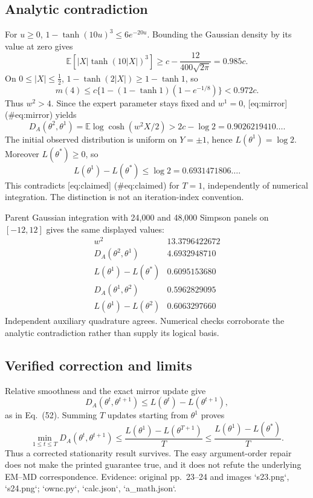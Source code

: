 \documentclass[10pt]{article}
\begin{document}
\subsection*{Analytic contradiction}
For \(u\ge0\), \(1-\tanh(10u)^3\le6e^{-20u}\). Bounding the Gaussian density by its value at zero gives \[\mathbb E[|X|\tanh(10|X|)^3]\ge
 c-\frac{12}{400\sqrt{2\pi}}=0.985c .\] On \(0\le |X|\le\tfrac12\), \(1-\tanh(2|X|)\ge1-\tanh1\), so \[m(4)\le c\{1-(1-\tanh1)(1-e^{-1/8})\}<0.972c .\] Thus \(w^2>4\). Since the expert parameter stays fixed and \(w^1=0\), [eq:mirror] (\#eq:mirror) yields \[D_A(\theta^2,\theta^1)
 =\mathbb E\log\cosh(w^2X/2)
 >2c-\log2=0.9026219410\ldots .\] The initial observed distribution is uniform on \(Y=\pm1\), hence \(L(\theta^1)=\log2\). Moreover \(L(\theta^*)\ge0\), so \[L(\theta^1)-L(\theta^*)\le\log2=0.6931471806\ldots .\] This contradicts [eq:claimed] (\#eq:claimed) for \(T=1\), independently of numerical integration. The distinction is not an iteration-index convention.\par
Parent Gaussian integration with 24,000 and 48,000 Simpson panels on \([-12,12]\) gives the same displayed values: \[\begin{array}{l|r}
 w^2&13.3796422672\\
 D_A(\theta^2,\theta^1)&4.6932948710\\
 L(\theta^1)-L(\theta^*)&0.6095153680\\
 D_A(\theta^1,\theta^2)&0.5962829095\\
 L(\theta^1)-L(\theta^2)&0.6063297660
\end{array}\] Independent auxiliary quadrature agrees. Numerical checks corroborate the analytic contradiction rather than supply its logical basis.\par
\subsection*{Verified correction and limits}
Relative smoothness and the exact mirror update give \[D_A(\theta^t,\theta^{t+1})\le L(\theta^t)-L(\theta^{t+1}),\] as in Eq. (52). Summing \(T\) updates starting from \(\theta^1\) proves \[\min_{1\le t\le T}D_A(\theta^t,\theta^{t+1})
 \le\frac{L(\theta^1)-L(\theta^{T+1})}{T}
 \le\frac{L(\theta^1)-L(\theta^*)}{T}.\] Thus a corrected stationarity result survives. The easy argument-order repair does not make the printed guarantee true, and it does not refute the underlying EM–MD correspondence. Evidence: original pp. 23–24 and images `s23.png`, `s24.png`; `ownc.py`, `calc.json`, `a\_math.json`.\par
\end{document}
